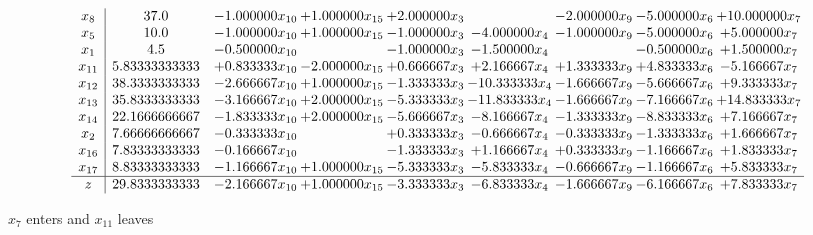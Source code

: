 \documentclass[10pt]{article}
\begin{document}
 \[\begin{array}{c| c c@{\hskip 2pt} c@{\hskip 2pt} c@{\hskip 2pt} c@{\hskip 2pt} c@{\hskip 2pt} c@{\hskip 2pt} c@{\hskip 2pt} }
 x_{8}   &  37.0 & -1.000000 x_{10} & + 1.000000 x_{15} & + 2.000000 x_{3} &   & -2.000000 x_{9} & -5.000000 x_{6} & + 10.000000 x_{7}\\
 x_{5}   &  10.0 & -1.000000 x_{10} & + 1.000000 x_{15} & -1.000000 x_{3} & -4.000000 x_{4} & -1.000000 x_{9} & -5.000000 x_{6} & + 5.000000 x_{7}\\
 x_{1}   &  4.5 & -0.500000 x_{10} &   & -1.000000 x_{3} & -1.500000 x_{4} &   & -0.500000 x_{6} & + 1.500000 x_{7}\\
 x_{11}   &  5.83333333333 & + 0.833333 x_{10} & -2.000000 x_{15} & + 0.666667 x_{3} & + 2.166667 x_{4} & + 1.333333 x_{9} & + 4.833333 x_{6} & -5.166667 x_{7}\\
 x_{12}   &  38.3333333333 & -2.666667 x_{10} & + 1.000000 x_{15} & -1.333333 x_{3} & -10.333333 x_{4} & -1.666667 x_{9} & -5.666667 x_{6} & + 9.333333 x_{7}\\
 x_{13}   &  35.8333333333 & -3.166667 x_{10} & + 2.000000 x_{15} & -5.333333 x_{3} & -11.833333 x_{4} & -1.666667 x_{9} & -7.166667 x_{6} & + 14.833333 x_{7}\\
 x_{14}   &  22.1666666667 & -1.833333 x_{10} & + 2.000000 x_{15} & -5.666667 x_{3} & -8.166667 x_{4} & -1.333333 x_{9} & -8.833333 x_{6} & + 7.166667 x_{7}\\
 x_{2}   &  7.66666666667 & -0.333333 x_{10} &   & + 0.333333 x_{3} & -0.666667 x_{4} & -0.333333 x_{9} & -1.333333 x_{6} & + 1.666667 x_{7}\\
 x_{16}   &  7.83333333333 & -0.166667 x_{10} &   & -1.333333 x_{3} & + 1.166667 x_{4} & + 0.333333 x_{9} & -1.166667 x_{6} & + 1.833333 x_{7}\\
 x_{17}   &  8.83333333333 & -1.166667 x_{10} & + 1.000000 x_{15} & -5.333333 x_{3} & -5.833333 x_{4} & -0.666667 x_{9} & -1.166667 x_{6} & + 5.833333 x_{7}\\
\hline
z    &  29.8333333333 & -2.166667 x_{10} & + 1.000000 x_{15} & -3.333333 x_{3} & -6.833333 x_{4} & -1.666667 x_{9} & -6.166667 x_{6} & + 7.833333 x_{7}\\
\end{array}\]


 $ x_{7} $ enters and $ x_{11} $ leaves 
\end{document}
